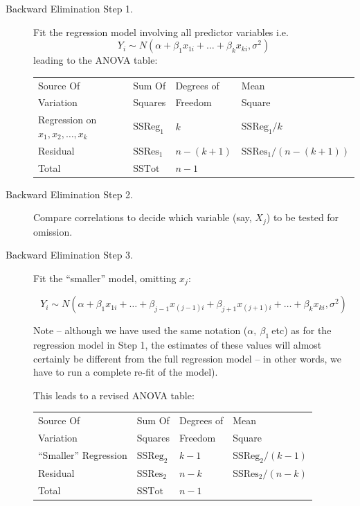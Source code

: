 \documentclass[12pt,a4paper,openany,twoside]{report}
\theoremstyle{definition}
\theoremstyle{remark}
\theoremstyle{plain}
\newcommand{\vsps}{\vspace{.5cm}}
\theoremstyle{definition}
\theoremstyle{definition}
\theoremstyle{definition}
\theoremstyle{remark}
\begin{document}
\begin{description}
\item[Backward Elimination Step 1.] Fit the regression model involving all predictor variables i.e. 
\[ Y_{i}\sim N(\alpha + \beta_{1}x_{1i} + \ldots + \beta_{k}x_{ki},\sigma^{2})\]
leading to the ANOVA table:\newline

\begin{longtable}[c]{@{}llll@{}}
\toprule
Source Of & Sum Of & Degrees of & Mean \\
Variation & Squares & Freedom & Square
\tabularnewline
\midrule
\endhead
Regression on
$x_{1}, x_{2},\ldots, x_{k}$
& \(\text{SSReg}_{1}\) & \(k\) & \(\text{SSReg}_{1}/k\)\tabularnewline
Residual & \(\text{SSRes}_{1}\) & \(n - (k + 1)\) &
\(\text{SSRes}_{1}/(n - \left( k + 1 \right))\)\tabularnewline
Total & \(\text{SSTot}_{}\) & \(n - 1\) &\tabularnewline
\bottomrule
\end{longtable}
\vsps

\item[Backward Elimination Step 2.] Compare correlations to decide which variable (say, \(X_{j}\)) to be
tested for omission.

\item[Backward Elimination Step 3.] Fit the ``smaller'' model, omitting \(x_{j}\):

$$Y_{i}\sim N(\alpha + \beta_{1}x_{1i}+\ldots+\beta_{j - 1}x_{(j - 1)i} + \beta_{j + 1}x_{(j + 1)i}+\ldots + \beta_{k}x_{ki},\sigma^{2})$$

Note -- although we have used the same notation
(\(\alpha,\ \beta_{1}\ \)etc) as for the regression model in Step 1, the
estimates of these values will almost certainly be different from the
full regression model -- in other words, we have to run a complete
re-fit of the model).

This leads to a revised ANOVA table:\newline

\begin{longtable}[c]{@{}llll@{}}
\toprule
Source Of & Sum Of & Degrees of & Mean \\
Variation & Squares & Freedom & Square
\tabularnewline
\midrule
\endhead
``Smaller'' Regression & \(\text{SSReg}_{2}\) & \(k-1\) &
\(\text{SSReg}_{2}/(k - 1)\)\tabularnewline
Residual & \(\text{SSRes}_{2}\) & \(n - k\) &
\(\text{SSRes}_{2}/(n - k)\)\tabularnewline
Total & \(\text{SSTot}_{}\) & \(n - 1\) &\tabularnewline
\bottomrule
\end{longtable}
\vsps


\end{description}
\end{document}
